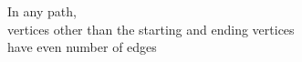 \documentclass[preview]{standalone}
\begin{document}
\begin{center}
In any path, \\ vertices other than the starting and ending vertices \\ have even number of edges
\end{center}
\end{document}
